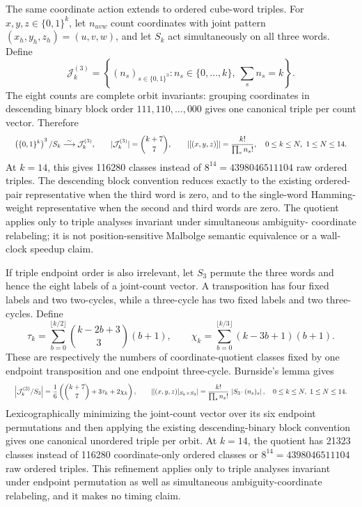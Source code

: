 \documentclass{article}
\newcommand{\fitmath}[1]{\resizebox{0.99\linewidth}{!}{$\displaystyle #1$}}
\begin{document}
The same coordinate action extends to ordered cube-word triples. For
$x,y,z\in\{0,1\}^k$, let $n_{uvw}$ count coordinates with joint pattern
$(x_h,y_h,z_h)=(u,v,w)$, and let $S_k$ act simultaneously on all three words.
Define
\[
  \mathcal{J}^{(3)}_k=\left\{(n_s)_{s\in\{0,1\}^3}:
    n_s\in\{0,\ldots,k\},\ \sum_s n_s=k\right\}.
\]
The eight counts are complete orbit invariants: grouping coordinates in
descending binary block order $111,110,\ldots,000$ gives one canonical triple
per count vector. Therefore
\begin{equation}
  \fitmath{%
    \left(\{0,1\}^k\right)^3/S_k
      \overset{\sim}{\longrightarrow}\mathcal{J}^{(3)}_k,
    \qquad
    |\mathcal{J}^{(3)}_k|=\binom{k+7}{7},
    \qquad
    |[(x,y,z)]|=\frac{k!}{\prod_s n_s!},
    \quad 0\leq k\leq N,\ 1\leq N\leq14.
  }
  \label{eq:optimization-crazy-preimage-cube-ordered-triple-quotient}
\end{equation}
At $k=14$, this gives 116280 classes instead of $8^{14}=4398046511104$ raw
ordered triples. The descending block convention reduces exactly to the
existing ordered-pair
representative when the third word is zero, and to the single-word Hamming-
weight representative when the second and third words are zero. The quotient
applies only to triple analyses invariant under simultaneous ambiguity-
coordinate relabeling; it is not position-sensitive Malbolge semantic
equivalence or a wall-clock speedup claim.

If triple endpoint order is also irrelevant, let $S_3$ permute the three words
and hence the eight labels of a joint-count vector. A transposition has four
fixed labels and two two-cycles, while a three-cycle has two fixed labels and
two three-cycles. Define
\[
  \tau_k=\sum_{b=0}^{\lfloor k/2\rfloor}
    \binom{k-2b+3}{3}(b+1),
  \qquad
  \chi_k=\sum_{b=0}^{\lfloor k/3\rfloor}(k-3b+1)(b+1).
\]
These are respectively the numbers of coordinate-quotient classes fixed by one
endpoint transposition and one endpoint three-cycle. Burnside's lemma gives
\begin{equation}
  \fitmath{%
    \left|\mathcal{J}^{(3)}_k/S_3\right|
      =\frac{1}{6}\left(\binom{k+7}{7}+3\tau_k+2\chi_k\right),
    \qquad
    \left|[(x,y,z)]_{S_k\times S_3}\right|
      =\frac{k!}{\prod_s n_s!}\,\left|S_3\!\cdot(n_s)_s\right|,
    \quad 0\leq k\leq N,\ 1\leq N\leq14.
  }
  \label{eq:optimization-crazy-preimage-cube-unordered-triple-quotient}
\end{equation}
Lexicographically minimizing the joint-count vector over its six endpoint
permutations and then applying the existing descending-binary block convention
gives one canonical unordered triple per orbit. At $k=14$, the quotient has
21323 classes instead of 116280 coordinate-only ordered classes or
$8^{14}=4398046511104$ raw ordered triples. This refinement applies only to
triple analyses invariant under endpoint permutation as well as simultaneous
ambiguity-coordinate relabeling, and it makes no timing claim.
\end{document}
